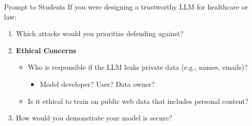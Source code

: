 \documentclass[12pt,aspectratio=169,handout]{beamer}
\begin{document}
\begin{frame}{Prompt to Students}
If you were designing a trustworthy LLM for healthcare or law:
\begin{enumerate}
    \item Which attacks would you prioritize defending against?
    \item \textbf{Ethical Concerns}
    \begin{itemize}
        \item Who is responsible if the LLM leaks private data (e.g., names, emails)?
        \begin{itemize}
            \item Model developer? User? Data owner?
        \end{itemize}
        \item Is it ethical to train on public web data that includes personal content?
    \end{itemize}
    \item How would you demonstrate your model is secure? 
\end{enumerate}
\end{frame}
\end{document}
